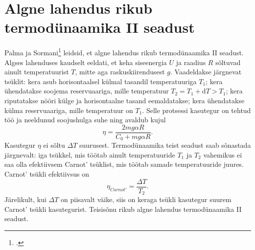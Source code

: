 \documentclass{trkut}%
\begin{document}
\section{Algne lahendus rikub termodünaamika II seadust} \label{rikub}

Palma ja Sormani\footcite[3-5]{palma15} leidsid, et algne lahendus rikub termodünaamika II seadust.
Algses lahenduses kaudselt eeldati, et keha siseenergia \(U\) ja raadius \(R\) sõltuvad ainult temperatuurist \(T\), mitte aga raskuskiirendusest \(g\).
Vaadeldakse järgnevat tsüklit: kera asub horisontaalsel külmal tasandil temperatuuriga \(T_1\); kera ühendatakse soojema reservuaariga, mille temperatuur \(T_2=T_1+\mathrm{d}T>T_1\); kera riputatakse nööri külge ja horisontaalne tasand eemaldatakse; kera ühendatakse külma reservuaariga, mille temperatuur on \(T_1\).
Selle protsessi kasutegur on tehtud töö ja neeldunud soojushulga suhe ning avaldub kujul \parencite[3-5]{palma15}
\begin{equation}
    \eta = \frac{2mg\alpha R}{C_0+mg\alpha R}.
\end{equation}
Kasutegur \(\eta\) ei sõltu \(\Delta T\) suurusest. Termodünaamika teist seadust saab sõnastada järgnevalt: iga tsükkel, mis töötab ainult temperatuuride \(T_1\) ja \(T_2\) vahemikus ei saa olla efektiivsem Carnot' tsüklist, mis töötab samade temperatuuride juures. Carnot' tsükli efektiivsus on \parencite[3-5]{palma15}
\begin{equation}
    \eta_{Carnot'} = \frac{\Delta T}{T_2}.
\end{equation}
Järelikult, kui \(\Delta T\) on piisavalt väike, siis on keraga tsükli kasutegur suurem Carnot' tsükli kasutegurist. Teisisõnu rikub algne lahendus termodünaamika II seadust.


%
\end{document}
